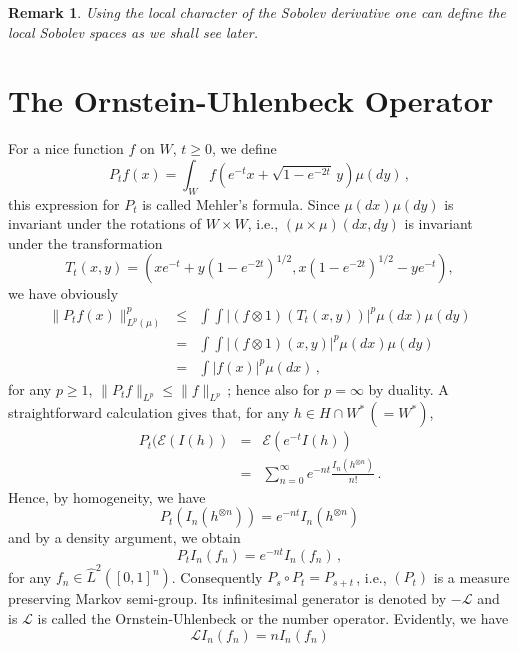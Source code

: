 \documentclass[12pt,a4paper]{book}
\newtheorem{remarkk}[theorem]{Remark}
\begin{document}
\begin{remarkk}
{\rm Using the local character of the Sobolev derivative one can
  define the local Sobolev spaces as we shall see later.}
\end{remarkk}





\section{The Ornstein-Uhlenbeck Operator}
For a nice function $f$ on $W$, $t\geq 0$, we define
\begin{equation}
\label{mehler-formula}
P_tf(x)=\int_W f\left(e^{-t} x+\sqrt{1-e^{-2t}}\,y\right)\mu(dy)\,,
\end{equation}
this expression for $P_t$ is called Mehler's formula.
\noindent
Since $\mu(dx)\mu(dy)$ is invariant under the rotations of $W\times W$, i.e.,
$(\mu\times\mu)(dx,dy)$ is invariant under the transformation
$$
T_{t}(x,y)=\left(xe^{-t}+y(1-e^{-2t})^{1/2},x(1-e^{-2t})^{1/2}-ye^{-t}\right),
$$
we have obviously
\begin{eqnarray*}
\|P_tf(x)\|_{L^p(\mu)}^p & \leq & \int\!\!\int
      |(f\otimes1)(T_t(x,y))|^p \mu(dx)\mu(dy) \\
& = & \int\!\!\int|(f\otimes1)(x,y)|^p\mu(dx)\mu(dy) \\
& = & \int|f(x)|^p\mu(dx)\,,
\end{eqnarray*}
for any $p\geq1$, $\|P_tf\|_{L^p}\leq\|f\|_{L^p}\,$; hence also for $p=\infty$
by duality. A straightforward calculation gives that, for any $h\in H\cap
W^\ast\,(=W^\ast)$,
\begin{eqnarray*}
P_t({\mathcal E}(I(h)) & = & {\mathcal E}(e^{-t} I(h)) \\
& = & \sum_{n=0}^\infty e^{-nt}\frac{I_n(h^{\otimes n})}{n!}\,.
\end{eqnarray*}
Hence, by homogeneity, we have
$$P_t(I_n(h^{\otimes n}))=e^{-nt}I_n(h^{\otimes n})$$
and by a  density argument, we obtain
$$
P_tI_n(f_n)=e^{-nt}I_n(f_n)\,,
$$
for any $f_n\in\hat{L}^2([0,1]^n)$. Consequently $P_s\circ P_t=P_{s+t}\,$,
i.e., $(P_t)$ is a measure preserving Markov
semi-group. Its infinitesimal
generator is denoted by  $-{\mathcal L}$ and  is ${\mathcal L}$ is  called the
Ornstein-Uhlenbeck 
 or the number  operator. Evidently,  we
have
\begin{equation}
\label{no-relation}
{\mathcal L}I_n(f_n)=n I_n(f_n)
\end{equation}
\end{document}

